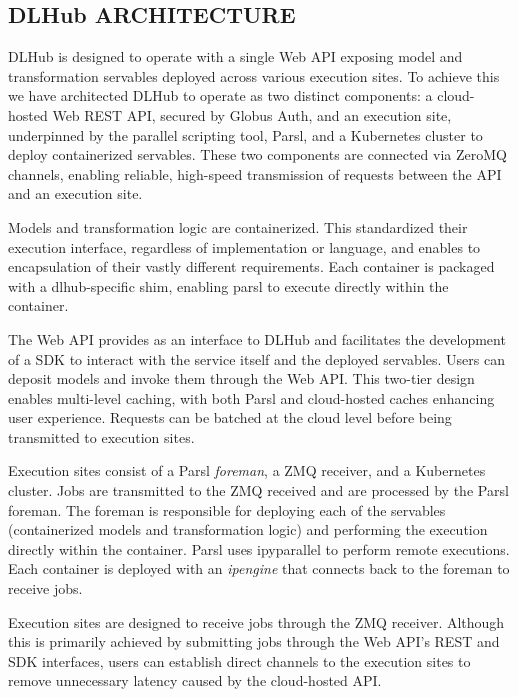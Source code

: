 \documentclass{aip-cp}
\newcommand\ryan[1]{}
\newcommand\ryan[1]{{\color{green}[Ryan: #1]}}
\begin{document}
\subsection{DLHub ARCHITECTURE}
\ryan{Super rough draft. I'll revisit tomorrow.}

DLHub is designed to operate with a single Web API exposing model and transformation 
servables deployed across various execution sites. To achieve this we have architected DLHub to 
operate as two distinct components: a cloud-hosted Web REST API, secured by Globus Auth, and an 
execution site, underpinned by the parallel scripting tool, Parsl, and a Kubernetes cluster to 
deploy containerized servables. These two components are connected via ZeroMQ channels, enabling 
reliable, high-speed transmission of requests between the API and an execution site.

Models and transformation logic are containerized. This standardized their execution interface, 
regardless of implementation or language, and enables to encapsulation of their vastly different 
requirements. Each container is packaged with a dlhub-specific shim, enabling parsl to execute 
directly within the container.

The Web API provides as an interface to DLHub and facilitates the development of a SDK to interact 
with the service itself and the deployed servables. Users can deposit models and invoke them 
through the Web API. This two-tier design enables multi-level caching, with both Parsl and 
cloud-hosted caches enhancing user experience. Requests can be batched at the cloud level before 
being transmitted to execution sites.

Execution sites consist of a Parsl \textit{foreman}, a ZMQ receiver, and a Kubernetes cluster. Jobs 
are transmitted to the ZMQ received and are processed by the Parsl foreman. The foreman is 
responsible for deploying each of the servables (containerized models and transformation logic) and 
performing the execution directly within the container. Parsl uses ipyparallel to perform remote 
executions. Each container is deployed with an \textit{ipengine} that connects back to the foreman 
to receive jobs.

Execution sites are designed to receive jobs through the ZMQ receiver. Although this is primarily 
achieved by submitting jobs through the Web API's REST and SDK interfaces, users can establish 
direct channels to the execution sites to remove unnecessary latency caused by the cloud-hosted API.
\end{document}
